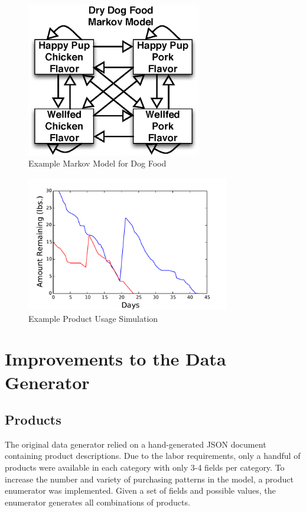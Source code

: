 \documentclass[conference]{IEEEtran}
\begin{document}
\begin{figure}[!t]
  \centering
  \includegraphics[width=3in]{figures/dog_food_markov_model.eps}
  \caption{Example Markov Model for Dog Food}
  \label{fig:dog_food_markov_model}
\end{figure}

\begin{figure}[!t]
  \centering
  \includegraphics[width=3.5in]{figures/item_usage_simulation.pdf}
  \caption{Example Product Usage Simulation}
  \label{fig:product_usage_sim}
\end{figure}


\section{Improvements to the Data Generator}
\subsection{Products}
The original data generator relied on a hand-generated JSON document containing product descriptions.  Due to the labor requirements, only a handful of products were available in each category with only 3-4 fields per category. To increase the number and variety of purchasing patterns in the model, a product enumerator was implemented.  Given a set of fields and possible values, the enumerator generates all combinations of products.
\end{document}
